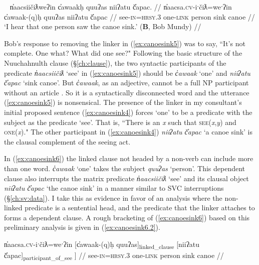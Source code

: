 \ex~ \label{ex:canoesink6}
\begingl
\glpreamble n̓aacsiičiƛweʔin c̓awaakḥ quuʔas niiʔatu č̓apac. //
\gla n̓aacsa.\textsc{cv}-iˑčiƛ=weˑʔin c̓awaak-(q)ḥ quuʔas niiʔatu č̓apac //
\glb see-\textsc{in}=\textsc{hrsy.3} one-\textsc{link} person sink canoe //
\glft `I hear that one person saw the canoe sink.' (\textbf{B}, Bob Mundy) //
\endgl
\xe

Bob's response to removing the linker in (\ref{ex:canoesink5}) was to say, ``It's not complete. One what? What did one see?" Following the basic structure of the Nuuchahnulth clause (\S\ref{ch:clause}), the two syntactic participants of the predicate \textit{n̓aacsiičiƛ} `see' in (\ref{ex:canoesink5}) should be \textit{c̓awaak} `one' and \textit{niiʔatu č̓apac} `sink canoe'. But \textit{c̓awaak}, as an adjective, cannot be a full NP participant without an article \citep{jacobsen1979}. So it is a syntactically disconnected word and the utterance (\ref{ex:canoesink5}) is nonsensical. The presence of the linker in my consultant's initial proposed sentence (\ref{ex:canoesink4}) forces `one' to be a predicate with the subject as the predicate `see'. That is, ``There is an \textit{x} such that \textsc{see}(\textit{x},\textit{y}) and \textsc{one}(\textit{x})." The other participant in (\ref{ex:canoesink4}) \textit{niiʔatu č̓apac} `a canoe sink' is the clausal complement of the seeing act.

In (\ref{ex:canoesink6}) the linked clause not headed by a non-verb can include more than one word. \textit{c̓awaak} `one' takes the subject \textit{quuʔas} `person'.  This dependent clause also interrupts the matrix predicate \textit{n̓aacsiičiƛ} `see' and its clausal object \textit{niiʔatu č̓apac} `the canoe sink' in a manner similar to SVC interruptions (\S\ref{ch:sv:data}). I take this as evidence in favor of an analysis where the non-linked predicate is a sentential head, and the predicate that the linker attaches to forms a dependent clause. A rough bracketing of (\ref{ex:canoesink6}) based on this preliminary analysis is given in (\ref{ex:canoesink6.2}).

\ex \label{ex:canoesink6.2}
\begingl
\gla {[}n̓aacsa.\textsc{cv}-iˑčiƛ=weˑʔin {[}c̓awaak-(q)ḥ quuʔas{]\textsubscript{linked\_clause}} {[}niiʔatu č̓apac{]\textsubscript{participant\_of\_see} ]} //
\glb see-\textsc{in}=\textsc{hrsy.3} one-\textsc{link} person sink canoe //
\endgl
\xe

